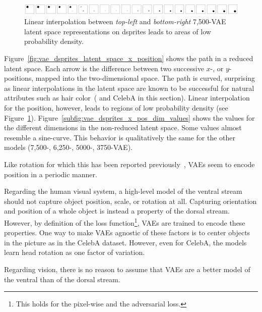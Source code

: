 
\begin{figure}
    \centering
    \includegraphics[width=\textwidth]{images/latent_space_traversals/vae_dsprites_7500_position.png}
    \caption{Linear interpolation between \textit{top-left} and \textit{bottom-right} 7,500-\ac{VAE} latent space representations on dsprites leads to areas of low probability density.}
    \label{fig:vae_7500_dsprites_position_interpolation}
\end{figure}

Figure~\ref{fig:vae_dsprites_latent_space_x_position} shows the path in a reduced latent space.
Each arrow is the difference between two successive $x$-, or $y$-positions, mapped into the two-dimensional space.
The path is curved, surprising as linear interpolations in the latent space are known to be successful for natural attributes such as hair color~(\citep{radford2016deep} and CelebA in this section).
Linear interpolation for the position, however, leads to regions of low probability density (see Figure~\ref{fig:vae_7500_dsprites_position_interpolation}).
Figure~\ref{subfig:vae_dsprites_x_pos_dim_values} shows the values for the different dimensions in the non-reduced latent space.
Some values almost resemble a sine-curve.
This behavior is qualitatively the same for the other models (7,500-, 6,250-, 5000-, 3750-\ac{VAE}).

Like rotation for which this has been reported previously~\citep{chen2018isolating}, \acp{VAE} seem to encode position in a periodic manner.

Regarding the human visual system, a high-level model of the ventral stream should not capture object position, scale, or rotation at all.
Capturing orientation and position of a whole object is instead a property of the dorsal stream.
However, by definition of the loss function\footnote{This holds for the pixel-wise and the adversarial loss.}, \acp{VAE} are trained to encode these properties.
One way to make \acp{VAE} agnostic of these factors is to center objects in the picture as in the CelebA dataset.
However, even for CelebA, the models learn head rotation as one factor of variation.

Regarding vision, there is no reason to assume that \acp{VAE} are a better model of the ventral than of the dorsal stream.

